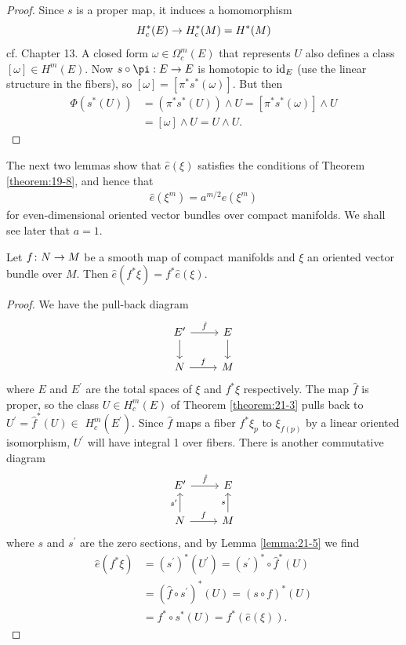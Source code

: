 \begin{proof}
  Since $s$ is a proper map, it induces a homomorphism
  \[
    H_c^*( E)  \rightarrow  H_c^*( M)  = {H}^*( M)
  \]
  cf. Chapter 13. A closed form $\omega  \in  {\Omega }_{c}^{m}( E)$ that represents $U$ also defines 
  a class $[  \omega ]   \in  H^m( E)$. Now $s \circ  \pi  : E \ra  E$ is 
  homotopic to ${\mathrm{id}}_{E}$ (use the linear structure in the fibers), so $[\omega] = [  {{\pi }^*{s}^*( \omega ) }]$. 
  But then
  \begin{align*}
      \Phi ( {{s}^*( U) })  
      & = ( {{\pi }^*{s}^*( U) })  \land  U = [  {{\pi }^*{s}^*( \omega ) }] \land  U \\
      & = [  \omega ]   \land  U = U \land  U\text{. }
  \end{align*}
\end{proof}

The next two lemmas show that $\hat{e}( \xi )$ satisfies the conditions of Theorem \ref{theorem:19-8}, 
and hence that
\begin{align}\label{eq:21-3}
  \hat{e}( {\xi }^{m})  = {a}^{m/2}e( {\xi }^{m})
\end{align}
for even-dimensional oriented vector bundles over compact manifolds. We shall see later that $a = 1$.

\begin{lemma}\label{lemma:21-6}
  Let $f\colon N \rightarrow  M$ be a smooth map of compact manifolds and $\xi$ an oriented vector bundle 
  over $M$. Then $\hat{e}( {{f}^*\xi })  = {f}^*\hat{e}( \xi )$.
\end{lemma}

\begin{proof}
  We have the pull-back diagram
  \[\begin{tikzcd}
    E'\rar{\hat f}\dar{} & E\dar{} \\
    N\rar{f} & M
  \end{tikzcd}\]
  where $E$ and ${E}^{\prime }$ are the total spaces of $\xi$ and ${f}^*\xi$ respectively. 
  The map $\hat{f}$ is proper, so the class $U \in  H_c^{m}( E)$ of Theorem \ref{theorem:21-3} pulls 
  back to ${U}^{\prime } = {\hat{f}}^*( U)  \in$  $H_c^{m}( {E}^{\prime })$. Since $\hat{f}$ maps 
  a fiber ${f}^*{\xi }_{p}$ to ${\xi }_{f( p) }$ by a linear oriented isomorphism, ${U}^{\prime }$ will 
  have integral 1 over fibers. There is another commutative diagram
  \[\begin{tikzcd}
    E'\rar{\hat f} & E \\
    N\rar{f}\uar{s'} & M\uar{s}
  \end{tikzcd}\]
  where $s$ and ${s}^{\prime }$ are the zero sections, and by Lemma \ref{lemma:21-5} we find
    \begin{align*}
      \hat{e}( {{f}^*\xi })  
      & = {( {s}^{\prime }) }^*( {U}^{\prime })  
        = {( {s}^{\prime }) }^* \circ  {\hat{f}}^*( U) \\
      & = {( \hat{f} \circ  {s}^{\prime }) }^*( U)  
        = {( s \circ  f) }^*( U) \\
      & = {f}^* \circ  {s}^*( U)  = {f}^*( {\hat{e}( \xi ) }).
    \end{align*}
\end{proof}


